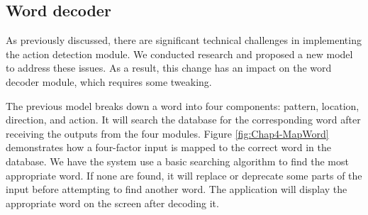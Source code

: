   


\subsection{Word decoder}













As previously discussed, there are significant technical challenges in implementing the action detection module. We conducted research and proposed a new model to address these issues. As a result, this change has an impact on the word decoder module, which requires some tweaking.

The previous model breaks down a word into four components: pattern, location, direction, and action. It will search the database for the corresponding word after receiving the outputs from the four modules. Figure \ref{fig:Chap4-MapWord} demonstrates how a four-factor input is mapped to the correct word in the database. We have the system use a basic searching algorithm to find the most appropriate word. If none are found, it will replace or deprecate some parts of the input before attempting to find another word. The application will display the appropriate word on the screen after decoding it.

